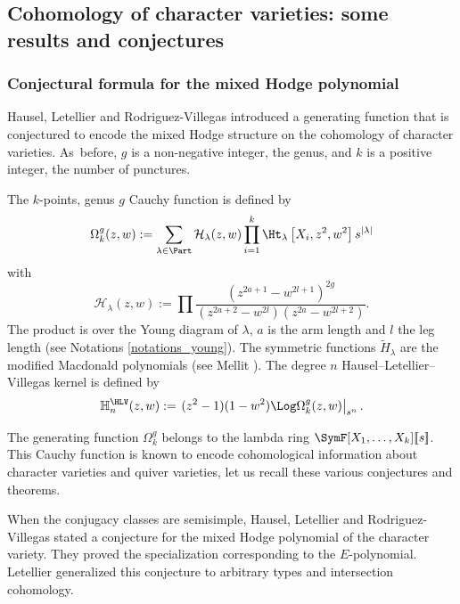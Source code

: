 \subsection{Cohomology of character varieties: some results and conjectures}\label{sect_cohomology_char}
\subsubsection{Conjectural formula for the mixed Hodge polynomial}
Hausel, Letellier and Rodriguez-Villegas \cite{Hausel_Letellier_Villegas} introduced a generating function that is conjectured to encode the mixed Hodge structure on the cohomology of character varieties. As~before, $g$ is a non-negative integer, the genus, and $k$ is a positive integer, the number of punctures.
\begin{definition}\label{def_omega_hlv}
The $k$-points, genus $g$ Cauchy function is defined by
\begin{equation}
\Omega^g_k(z,w):=\sum_{\lambda\in\Part}\mathcal{H}_\lambda(z,w)\prod_{i=1}^k\Ht_\lambda\left[X_i,z^2,w^2\right]s^{|\lambda|}
\end{equation}
with
\begin{equation}
\mathcal{H}_\lambda(z,w):=\prod\frac{\left(z^{2a+1}-w^{2l+1}\right)^{2g}}{\left(z^{2a+2}-w^{2l}\right)\left(z^{2a}-w^{2l+2}\right)}.
\end{equation}
The product is over the Young diagram of $\lambda$, $a$ is the arm length and $l$ the leg length (see Notations \ref{notations_young}). The symmetric functions
$\widetilde{H}_{\lambda}$ are the modified Macdonald polynomials (see Mellit \cite[Def.\,2.5]{Mellit2020}).
The degree $n$ Hausel--Letellier--Villegas kernel is defined by
\[
\mathbb{H}^{\HLV}_n(z,w):=\left.(z^2-1)(1-w^2) \Log \Omega_k^g(z,w)\right|_{s^n}.
\]
\end{definition}
The generating function $\Omega_k^g$ belongs to the lambda ring $\SymF[X_1,\dots,X_k][\![s]\!]$. This Cauchy function is known to encode cohomological information about character varie\-ties and quiver varieties, let us recall these various conjectures and theorems.

\begin{sloppypar}
When the conjugacy classes are semisimple, Hausel, Letellier and Rodriguez-Villegas \cite{Hausel_Letellier_Villegas} stated a conjecture for the mixed Hodge polynomial of the character variety. They proved the specialization corresponding to the $E$-polynomial. Letellier generalized this conjecture to arbitrary types and intersection cohomology.
\end{sloppypar}

